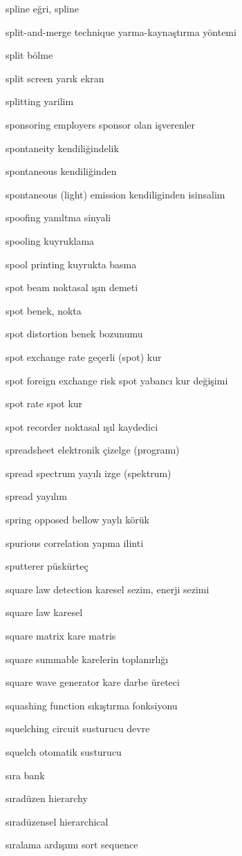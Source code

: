 \documentclass[12pt,fleqn]{article}\usepackage{../../common}
\begin{document}
spline eğri, spline

split-and-merge technique yarma-kaynaştırma yöntemi

split bölme

split screen yarık ekran

splitting yarilim

sponsoring employers sponsor olan işverenler

spontaneity kendiliğindelik

spontaneous kendiliğinden

spontaneous (light) emission kendiliginden isinsalim

spoofing yanıltma sinyali

spooling kuyruklama

spool printing kuyrukta basma

spot beam noktasal ışın demeti

spot benek, nokta

spot distortion benek bozunumu

spot exchange rate geçerli (spot) kur

spot foreign exchange risk spot yabancı kur değişimi

spot rate spot kur

spot recorder noktasal ışıl kaydedici

spreadsheet elektronik çizelge (programı)

spread spectrum yayılı izge (spektrum)

spread yayılım

spring opposed bellow yaylı körük

spurious correlation yapma ilinti

sputterer püskürteç

square law detection karesel sezim, enerji sezimi

square law karesel

square matrix kare matris

square summable karelerin toplanırlığı

square wave generator kare darbe üreteci

squashing function sıkıştırma fonksiyonu

squelching circuit susturucu devre

squelch otomatik susturucu

sıra bank

sıradüzen hierarchy

sıradüzensel hierarchical

sıralama ardışımı sort sequence
\end{document}

